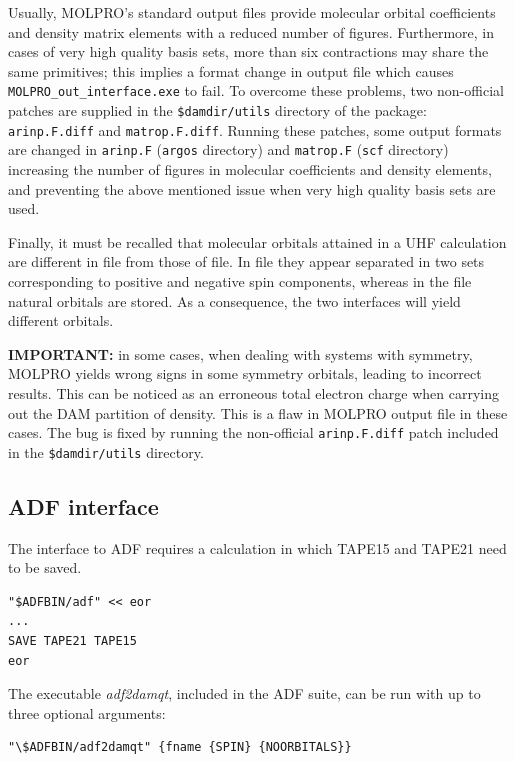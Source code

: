 \documentclass[10pt]{article}
\begin{document}
Usually, MOLPRO's standard output files provide molecular orbital coefficients and 
density matrix elements with a reduced number of figures. Furthermore, in cases of very 
high quality basis sets, more than six contractions may share the same primitives; 
this implies a format change in output file which causes 
\texttt{MOLPRO\_out\_interface.exe} to fail. To overcome these problems, two non-official 
patches are supplied in the \texttt{\$damdir/utils} directory of the package: 
\texttt{arinp.F.diff} and \texttt{matrop.F.diff}. Running these patches, some output 
formats are changed in \texttt{arinp.F} (\texttt{argos} directory) and \texttt{matrop.F} 
(\texttt{scf} directory) increasing the number of figures in molecular coefficients 
and density elements, and preventing the above mentioned 
issue when very high quality basis sets are used.

Finally, it must be recalled that molecular orbitals attained in a 
UHF calculation are different in \out{ } file 
from those of \xml{ } file. In \out{ } file they appear separated in two sets corresponding 
to positive and negative spin components, whereas in the \xml{ } file natural orbitals 
are stored. As a consequence, the two interfaces will yield different orbitals.

{\bf IMPORTANT:} in some cases, when dealing with systems with symmetry, MOLPRO yields wrong 
signs in some symmetry orbitals, leading to incorrect results. This can be noticed as an 
erroneous total electron charge when carrying out the DAM partition of density. 
This is a flaw in MOLPRO output file in these cases. The bug is fixed by running 
the non-official \texttt{arinp.F.diff} patch included in the \texttt{\$damdir/utils} directory.


\subsection{ADF interface \label{sec:5.3}}

The interface to ADF requires a calculation in which 
TAPE15 and TAPE21 need to be saved. 

\begin{verbatim}
"$ADFBIN/adf" << eor
...
SAVE TAPE21 TAPE15
eor
\end{verbatim}

The executable {\it adf2damqt}, included in the ADF suite, can be run with up to three optional arguments: 

\begin{verbatim}
"\$ADFBIN/adf2damqt" {fname {SPIN} {NOORBITALS}}
\end{verbatim}
\end{document}
